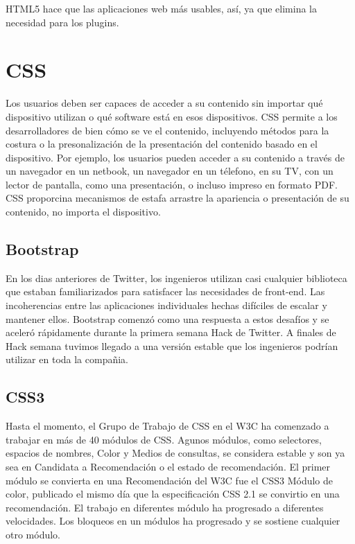 HTML5 hace que las aplicaciones web m\'{a}s usables, as\'{i}, ya que elimina la
necesidad para los plugins. \cite{wang2013definitive}


\section{CSS}

Los usuarios deben ser capaces de acceder a su contenido sin importar qu\'{e} 
dispositivo utilizan o qu\'{e} software est\'{a} en esos dispositivos. CSS 
permite a los desarrolladores de bien c\'{o}mo se ve el contenido, incluyendo 
m\'{e}todos para la costura o la presonalizaci\'{o}n de la presentaci\'{o}n del
contenido basado en el dispositivo. Por ejemplo, los usuarios pueden acceder a su
contenido a trav\'{e}s de un navegador en un netbook, un navegador en un t\'{e}lefono,
en su TV, con un lector de pantalla, como una presentaci\'{o}n, o incluso impreso
en formato PDF. CSS proporcina mecanismos de estafa arrastre la apariencia o 
presentaci\'{o}n de su contenido, no importa el dispositivo.\cite{weyl2012s}

\subsection{Bootstrap}

En los dias anteriores de Twitter, los ingenieros utilizan casi cualquier 
biblioteca que estaban familiarizados para satisfacer las necesidades de 
front-end. Las incoherencias entre las aplicaciones individuales hechas dif\'{i}ciles
de escalar y mantener ellos. Bootstrap comenz\'{o} como una respuesta a estos 
desaf\'{i}os y se aceler\'{o} r\'{a}pidamente durante la primera semana Hack de
Twitter. A finales de Hack semana tuvimos llegado a una versi\'{o}n estable que
los ingenieros podr\'{i}an utilizar en toda la compa\~{n}ia.\cite{spurlock2013bootstrap}

\subsection{CSS3}

Hasta el momento, el Grupo de Trabajo de CSS en el W3C ha comenzado a trabajar 
en m\'{a}s de 40 m\'{o}dulos de CSS. Agunos m\'{o}dulos, como selectores, 
espacios de nombres, Color y Medios de consultas, se considera estable y son ya
sea en Candidata a Recomendaci\'{o}n o el estado de recomendaci\'{o}n. El primer
m\'{o}dulo se convierta en una Recomendaci\'{o}n del W3C fue el CSS3 M\'{o}dulo
de color, publicado el mismo d\'{i}a que la especificaci\'{o}n CSS 2.1 se convirtio
en una recomendaci\'{o}n. El trabajo en diferentes m\'{o}dulo ha progresado a 
diferentes velocidades. Los bloqueos en un m\'{o}dulos ha progresado y se sostiene
cualquier otro m\'{o}dulo.\cite{spurlock2013bootstrap}

